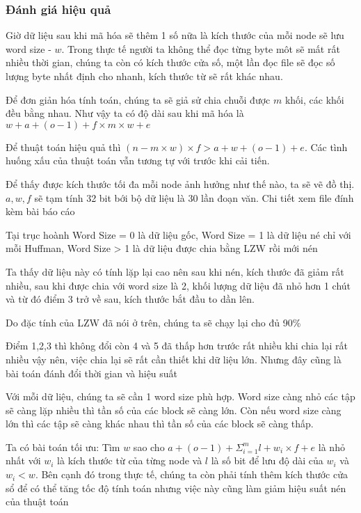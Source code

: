 \subsubsection{Đánh giá hiệu quả}

Giờ dữ liệu sau khi mã hóa sẽ thêm 1 số nữa là kích thước của mỗi node sẽ lưu word size - $w$. Trong thực tế người ta không thể đọc từng byte môt sẽ mất rất nhiều thời gian, chúng ta còn có kích thước cửa số, một lần đọc file sẽ đọc số lượng byte nhất định cho nhanh, kích thước từ sẽ rất khác nhau.

Để đơn giản hóa tính toán, chúng ta sẽ giả sử chia chuỗi được $m$ khối, các khối đều bằng nhau. Như vậy ta có độ dài sau khi mã hóa là $w + a + (o - 1) + f \times m \times w + e$

Để thuật toán hiệu quả thì $(n - m \times w) \times f > a + w + (o - 1) + e$. Các tình huống xấu của thuật toán vẫn tương tự với trước khi cải tiến.

Để thấy được kích thước tối đa mỗi node ảnh hưởng như thế nào, ta sẽ vẽ đồ thị. $a, w, f$ sẽ tạm tính 32 bit bới bộ dữ liệu là 30 lần đoạn văn. Chi tiết xem file đính kèm bài báo cáo

Tại trục hoành Word Size = 0 là dữ liệu gốc, Word Size = 1 là dữ liệu né chỉ với mỗi Huffman, Word Size > 1 là dữ liệu được chia bằng LZW rồi mới nén


Ta thấy dữ liệu này có tính lặp lại cao nên sau khi nén, kích thước đã giảm rất nhiều, sau khi được chia với word size là 2, khối lượng dữ liệu đã nhỏ hơn 1 chút và từ đó điểm 3 trở về sau, kích thước bắt đầu to dần lên.

Do đặc tính của LZW đã nói ở trên, chúng ta sẽ chạy lại cho đủ 90\%


Điểm 1,2,3 thì không đổi còn 4 và 5 đã thấp hơn trước rất nhiều khi chia lại rất nhiều vậy nên, việc chia lại sẽ rất cần thiết khi dữ liệu lớn. Nhưng đây cũng là bài toán đánh đổi thời gian và hiệu suất

Với mỗi dữ liệu, chúng ta sẽ cần 1 word size phù hợp. Word size càng nhỏ các tập sẽ càng lặp nhiều thì tần số của các block sẽ càng lớn. Còn nếu word size càng lớn thì các tập sẽ càng khác nhau thì tần số của các block sẽ càng thấp.

Ta có bài toán tối ưu: Tìm $w$ sao cho $a + (o - 1) + \Sigma^m_{i=1}{l + w_i \times f} + e$ là nhỏ nhất với $w_i$ là kích thước từ của từng node và $l$ là số bit để lưu độ dài của $w_i$ và $w_i < w$. Bên cạnh đó trong thực tế, chúng ta còn phải tính thêm kích thước cửa sổ để có thể tăng tốc độ tính toán nhưng việc này cũng làm giảm hiệu suất nén của thuật toán

